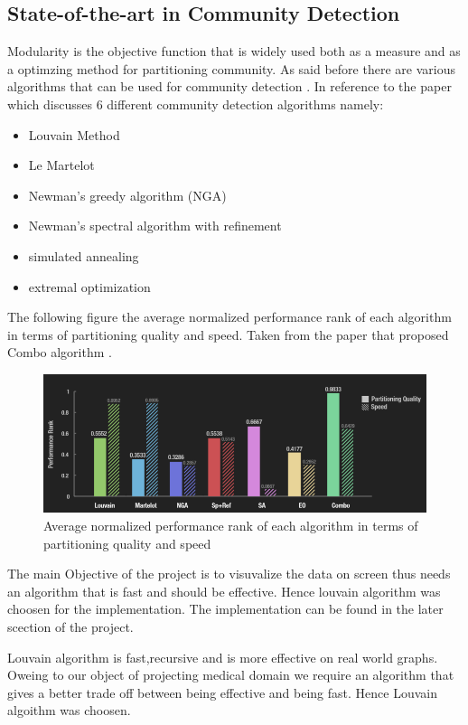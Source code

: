 \subsection{State-of-the-art in Community Detection}
Modularity is the objective function that is widely used both as a measure and as a optimzing method for partitioning community.
As said before there are various algorithms that can be used for community detection . In reference to the paper \cite{generalcommunity} which discusses 6 different community detection algorithms namely: 
\begin{itemize}
\item Louvain Method
\item Le Martelot
\item Newman’s greedy algorithm (NGA)
\item Newman’s spectral algorithm with refinement
\item simulated annealing
\item extremal optimization
\end{itemize}
The following figure the average normalized performance rank of each algorithm in terms of partitioning quality and speed. Taken from the paper that proposed Combo algorithm \cite{generalcommunity}. 
\begin{figure}[h]
\caption{Average normalized performance rank of each algorithm in terms of partitioning quality and speed}
\includegraphics[scale=0.5]{lou.png}
\centering
\end{figure}
The main Objective of the project is to visuvalize the data on screen thus needs an algorithm that is fast and should be effective.  Hence louvain algorithm was choosen for the implementation. The implementation can be found in the later scection of the project.


Louvain algorithm \cite{louvain} is fast,recursive and is more effective on real world graphs. Oweing to our object of projecting medical domain we require an algorithm that gives a better trade off between being effective and being fast. Hence Louvain algoithm was choosen.


